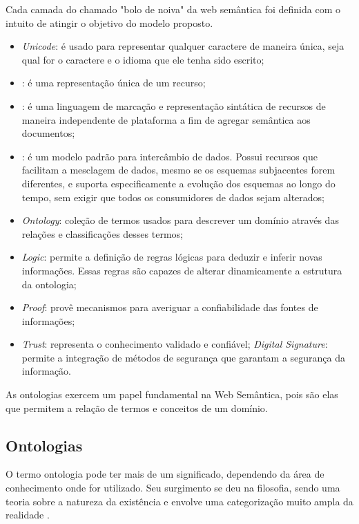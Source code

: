     Cada camada do chamado "bolo de noiva" da web semântica foi definida com o intuito de atingir o objetivo do modelo proposto.
    
    \begin{itemize}
    	\item \textit{Unicode}: é usado para representar qualquer caractere de maneira única, seja qual for o caractere e o idioma  que ele tenha sido escrito;
        \item {}: é uma representação única de um recurso;
        \item {}: é uma linguagem de marcação e representação sintática de recursos de  maneira independente de plataforma a fim de agregar semântica aos documentos;
        \item {}: é um modelo padrão para intercâmbio de dados. Possui recursos que facilitam a mesclagem de dados, mesmo se os esquemas subjacentes forem diferentes, e suporta especificamente a evolução dos esquemas ao longo do tempo, sem exigir que todos os consumidores de dados sejam alterados;
        \item \textit{Ontology}: coleção de termos usados para descrever um domínio através das relações e classificações desses termos;
        \item \textit{Logic}: permite a definição de regras lógicas para deduzir e inferir novas informações. Essas regras são capazes de alterar dinamicamente a estrutura da ontologia;
        \item \textit{Proof}: provê mecanismos para averiguar a confiabilidade das fontes de informações;
        \item \textit{Trust}: representa o conhecimento validado e confiável;
        \textit{Digital Signature}: permite a integração de métodos de segurança que garantam a segurança da informação.
    \end{itemize}
    
    As ontologias exercem um papel fundamental na Web Semântica, pois são elas que permitem a relação de termos e conceitos de um domínio.
    
    \subsection{Ontologias}
    
        O termo ontologia pode ter mais de um significado, dependendo da área de conhecimento onde for utilizado. Seu surgimento se deu na filosofia, sendo uma teoria sobre a natureza da existência e envolve uma categorização muito ampla da realidade \cite{CHATEUABRIAND1998}.
        
